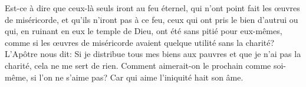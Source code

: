 Est-ce à dire que ceux-là seuls iront au feu éternel,
	qui n’ont point fait les œuvres de miséricorde,
	et qu’ils n’iront pas à ce feu, ceux qui ont pris le bien d’autrui
	ou qui, en ruinant en eux le temple de Dieu,
		ont été sans pitié pour eux-mêmes,
	comme si les œuvres de miséricorde avaient quelque utilité sans la charité?
L’Apôtre nous dit:
	Si je distribue tous mes biens aux pauvres et que je n’ai pas la charité,
	cela ne me sert de rien.
Comment aimerait-on le prochain comme soi-même, si l’on ne s’aime pas?
	Car qui aime l’iniquité hait son âme.
